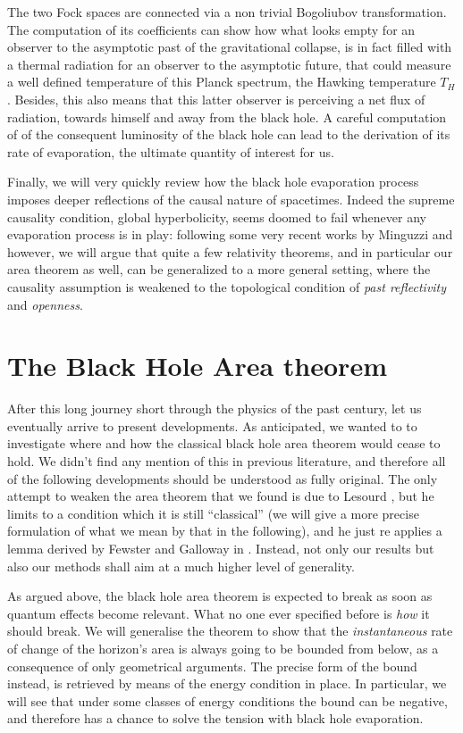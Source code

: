 The two Fock spaces are connected via a non trivial Bogoliubov transformation. The computation of its coefficients can show how what looks empty for an observer to the asymptotic past of the gravitational collapse, is in fact filled with a thermal radiation for an observer to the asymptotic future, that could measure a well defined temperature of this Planck spectrum, the Hawking temperature \(T_H\). Besides, this also means that this latter observer is perceiving a net flux of radiation, towards himself and away from the black hole. A careful computation of of the consequent luminosity of the black hole can lead to the derivation of its rate of evaporation, the ultimate quantity of interest for us.

Finally, we will very quickly review how the black hole evaporation process imposes deeper reflections of the causal nature of spacetimes. Indeed the supreme causality condition, global hyperbolicity, seems doomed to fail whenever any evaporation process is in play: following some very recent works by Minguzzi \cite[]{minguzzi2020gravitational} and \cite[]{minguzzi2019lorentzian} however, we will argue that quite a few relativity theorems, and in particular our area theorem as well, can be generalized to a more general setting, where the causality assumption is weakened to the topological condition of \emph{past reflectivity} and \emph{openness}.

\section{The Black Hole Area theorem}

After this long journey short through the physics of the past century, let us eventually arrive to present developments.
As anticipated, we wanted to to investigate where and how the classical black hole area theorem would cease to hold. We didn't find any mention of this in previous literature, and therefore all of the following developments should be understood as fully original. The only attempt to weaken the area theorem that we found is due to Lesourd \cite[]{lesourd2018remark}, but he limits to a condition which it is still ``classical'' (we will give a more precise formulation of what we mean by that in the following), and he just re applies a lemma derived by Fewster and Galloway in \cite[]{fewster2011singularity}. Instead, not only our results but also our methods shall aim at a much higher level of generality.

As argued above, the black hole area theorem is expected to break as soon as quantum effects become relevant. What no one ever specified before is \emph{how} it should break. We will generalise the theorem to show that the \emph{instantaneous} rate of change of the horizon's area is always going to be bounded from below, as a consequence of only geometrical arguments. The precise form of the bound instead, is retrieved by means of the energy condition in place. In particular, we will see that under some classes of energy conditions the bound can be negative, and therefore has a chance to solve the tension with black hole evaporation.

